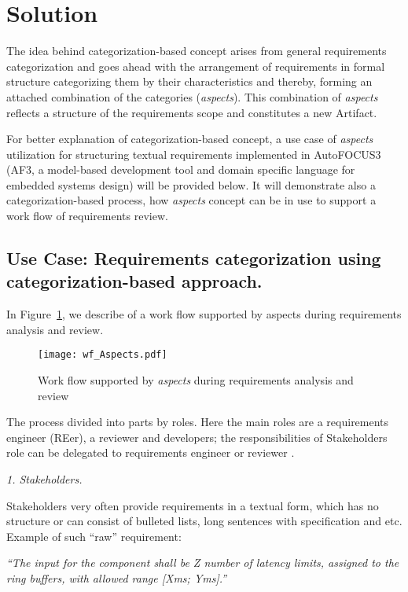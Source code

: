 
\section{Solution}
The idea behind categorization-based concept arises from general requirements categorization and goes ahead with the arrangement of requirements in formal structure categorizing them by their characteristics and thereby, forming an attached combination of the categories (\textit{aspects}). This combination of \textit{aspects} reflects a structure of the requirements scope and constitutes a new Artifact. 

For better explanation of categorization-based concept, a use case of \textit{aspects} utilization for structuring textual requirements implemented in AutoFOCUS3 (AF3, a model-based development tool and domain specific language for embedded systems design) will be provided below. It will demonstrate also a categorization-based process, how \textit{aspects} concept can be in use to support a work flow of requirements review.

\subsection {Use Case: Requirements categorization using categorization-based approach.}
In Figure~\ref{fig:fig_review}, we describe of a work flow supported by aspects during requirements analysis and review.
\begin{figure}[!t]
\centering
\texttt{[image: wf\_Aspects.pdf]}
\caption{Work flow supported by \textit{aspects} during requirements analysis and review}
\label{fig:fig_review}
\end{figure}

The process divided into parts by roles. Here the main roles are a requirements engineer (REer), a reviewer and developers; the responsibilities of Stakeholders role can be delegated to requirements engineer or reviewer \cite{17MiniDuide}.  

\textit{1. Stakeholders.}

Stakeholders very often provide requirements in a textual form, which has no structure or can consist of bulleted lists, long sentences with specification and etc. Example of such “raw” requirement: 

\textit{“The input for the component shall be Z number of latency limits, assigned to the ring buffers, with allowed range [Xms; Yms].”}  

